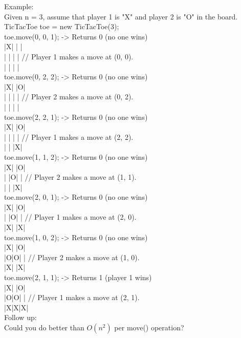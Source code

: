 Example:\\
Given n = 3, assume that player 1 is "X" and player 2 is "O" in the board.\\
TicTacToe toe = new TicTacToe(3);\\

toe.move(0, 0, 1); -> Returns 0 (no one wins)\\
|X| | |\\
| | | | // Player 1 makes a move at (0, 0).\\
| | | |\\

toe.move(0, 2, 2); -> Returns 0 (no one wins)\\
|X| |O|\\
| | | | // Player 2 makes a move at (0, 2).\\
| | | |\\

toe.move(2, 2, 1); -> Returns 0 (no one wins)\\
|X| |O|\\
| | | | // Player 1 makes a move at (2, 2).\\
| | |X|\\

toe.move(1, 1, 2); -> Returns 0 (no one wins)\\
|X| |O|\\
| |O| | // Player 2 makes a move at (1, 1).\\
| | |X|\\

toe.move(2, 0, 1); -> Returns 0 (no one wins)\\
|X| |O|\\
| |O| | // Player 1 makes a move at (2, 0).\\
|X| |X|\\

toe.move(1, 0, 2); -> Returns 0 (no one wins)\\
|X| |O|\\
|O|O| | // Player 2 makes a move at (1, 0).\\
|X| |X|\\

toe.move(2, 1, 1); -> Returns 1 (player 1 wins)\\
|X| |O|\\
|O|O| | // Player 1 makes a move at (2, 1).\\
|X|X|X|\\

Follow up:\\
Could you do better than $O(n^2)$ per move() operation?\\

